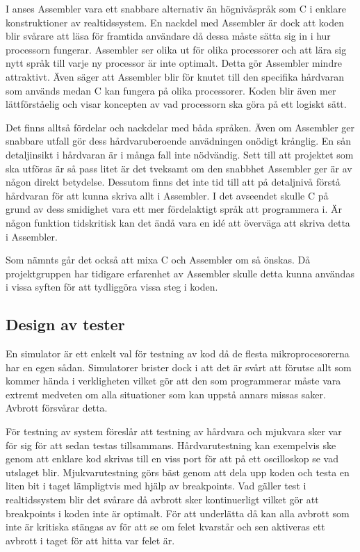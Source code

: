 \documentclass[11pt]{article}
\begin{document}
\begin{flushleft}
I \cite{RWD} anses Assembler vara ett snabbare alternativ än högnivåspråk som C i enklare konstruktioner av realtidssystem. En nackdel med Assembler är dock att koden blir svårare att läsa för framtida användare då dessa måste sätta sig in i hur processorn fungerar. Assembler ser olika ut för olika processorer och att lära sig nytt språk till varje ny processor är inte optimalt.  Detta gör Assembler mindre attraktivt. Även \cite{CPM} säger att Assembler blir för knutet till den specifika hårdvaran som används medan C kan fungera på olika processorer. Koden blir även mer lättförståelig och visar koncepten av vad processorn ska göra på ett logiskt sätt. 

Det finns alltså fördelar och nackdelar med båda språken. Även om Assembler ger snabbare utfall gör dess hårdvaruberoende anvädningen onödigt krånglig. En sån detaljinsikt i hårdvaran är i många fall inte nödvändig. Sett till att projektet som ska utföras är så pass litet är det tveksamt om den snabbhet Assembler ger är av någon direkt betydelse. Dessutom finns det inte tid till att på detaljnivå förstå hårdvaran för att kunna skriva allt i Assembler. I det avseendet skulle C på grund av dess smidighet vara ett mer fördelaktigt språk att programmera i. Är någon funktion tidskritisk kan det ändå vara en idé att överväga att skriva detta i Assembler. 

Som nämnts går det också att mixa C och Assembler om så önskas. Då projektgruppen har tidigare erfarenhet av Assembler skulle detta kunna användas i vissa syften för att tydliggöra vissa steg i koden. 


\subsection{Design av tester}
En simulator är ett enkelt val för testning av kod då de flesta mikroprocesorerna har en egen sådan. Simulatorer brister dock i att det är svårt att förutse allt som kommer hända i verkligheten vilket gör att den som programmerar måste vara extremt medveten om alla situationer som kan uppstå annars missas saker. Avbrott försvårar detta.\cite{RWD}

För testning av system föreslår \cite{RWD} att testning av hårdvara och mjukvara sker var för sig för att sedan testas tillsammans. Hårdvarutestning kan exempelvis ske genom att enklare kod skrivas till en viss port för att på ett oscilloskop se vad utslaget blir. Mjukvarutestning görs bäst genom att dela upp koden och testa en liten bit i taget lämpligtvis med hjälp av breakpoints. Vad gäller test i realtidssystem blir det svårare då avbrott sker kontinuerligt vilket gör att breakpoints i koden inte är optimalt. För att underlätta då kan alla avbrott som inte är kritiska stängas av för att se om felet kvarstår och sen aktiveras ett avbrott i taget för att hitta var felet är.


\end{flushleft}
\end{document}

